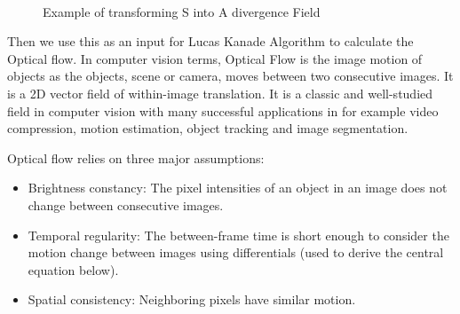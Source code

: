 \documentclass[12pt,fleqn]{book} %
\begin{document}
\begin{figure}[h]
\begin{dBox}
\centering
  \mbox{
   }
   \caption{Example of transforming S into A divergence Field \label{fig:dynamic345} }   
\end{dBox}   
\end{figure}
\bigskip

Then we use this as an input for Lucas Kanade Algorithm to calculate the Optical flow. In computer vision terms, Optical Flow is the image motion of objects as the objects, scene or camera, moves between two consecutive images. It is a 2D vector field of within-image translation. It is a classic and well-studied field in computer vision with many successful applications in for example video compression, motion estimation, object tracking and image segmentation.\bigskip

Optical flow relies on three major assumptions:
\begin{itemize}
\item 	Brightness constancy: The pixel intensities of an object in an image does not change between consecutive images.

\item  Temporal regularity: The between-frame time is short enough to consider the motion change between images using differentials (used to derive the central equation below).

\item  Spatial consistency: Neighboring pixels have similar motion.
\end{itemize}
\end{document}

